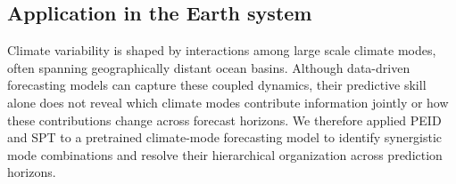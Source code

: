 \documentclass[fleqn,10pt]{wlscirep}
\theoremstyle{naturetheorem}
\begin{document}
% 

\subsection*{Application in the Earth system}

Climate variability is shaped by interactions among large scale climate modes, often spanning geographically distant ocean basins. Although data-driven forecasting models can capture these coupled dynamics, their predictive skill alone does not reveal which climate modes contribute information jointly or how these contributions change across forecast horizons. We therefore applied PEID and SPT to a pretrained climate-mode forecasting model to identify synergistic mode combinations and resolve their hierarchical organization across prediction horizons.
\end{document}
